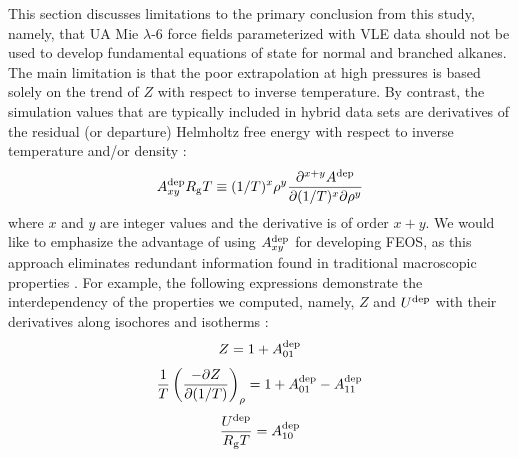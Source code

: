 \documentclass[preprint,letterpaper,floatfix,citeautoscript,aip,jcp]{revtex4-1}
\begin{document}
This section discusses limitations to the primary conclusion from this study, namely, that UA Mie $\lambda$-6 force fields parameterized with VLE data should not be used to develop fundamental equations of state for normal and branched alkanes. The main limitation is that the poor extrapolation at high pressures is based solely on the trend of $Z$ with respect to inverse temperature. 
By contrast, the simulation values that are typically included in hybrid data sets are derivatives of the residual (or departure) Helmholtz free energy with respect to inverse temperature and/or density \cite{Thol2016_siloxane_first,Thol2016_siloxane,Thol2017,Rutkai2013,Thol2015}:
\begin{equation} \label{Residual Derivatives}
A_{xy}^{\rm dep} R_{\rm g}T \equiv (1/T)^x\rho^y \frac{\partial^{x+y}A^{\rm dep}}{\partial(1/T)^x \partial \rho^y}
\end{equation}
where $x$ and $y$ are integer values and the derivative is of order $x + y$. We would like to emphasize the advantage of using $A_{xy}^{\rm dep}$ for developing FEOS, as this approach eliminates redundant information found in traditional macroscopic properties \cite{Thol2016_LJ,Rutkai2017,Lustig2015,Rutkai2013,Rutkai2015}. For example, the following expressions demonstrate the interdependency of the properties we computed, namely, $Z$ and $U^{\rm dep}$ with their derivatives along isochores and isotherms \cite{Rutkai2015}:
\begin{equation} \label{eq:Z}
Z = 1 + A_{01}^{\rm dep}
\end{equation}
\begin{equation} \label{eq:Z_IC}
\frac{1}{T} \left(\frac{-\partial Z}{\partial(1/T)}\right)_\rho = 1 + A_{01}^{\rm dep} - A_{11}^{\rm dep}
\end{equation}
\begin{equation} \label{eq:U}
\frac{U^{\rm dep}}{R_{\rm g}T} = A_{10}^{\rm dep}
\end{equation}
\end{document}
